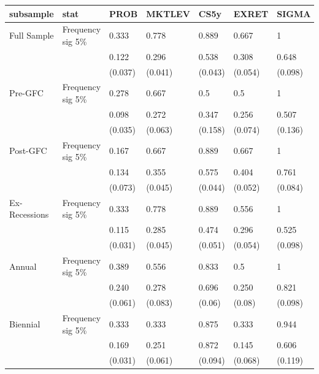 
\begin{tabular}{l|l|l|l|l|l|l}
\hline
subsample & stat & PROB & MKTLEV & CS5y & EXRET & SIGMA\\
\hline
Full Sample & Frequency sig 5\% & 0.333 & 0.778 & 0.889 & 0.667 & 1\\
 &  & 0.122 & 0.296 & 0.538 & 0.308 & 0.648\\
 &  & (0.037) & (0.041) & (0.043) & (0.054) & (0.098)\\
Pre-GFC & Frequency sig 5\% & 0.278 & 0.667 & 0.5 & 0.5 & 1\\
 &  & 0.098 & 0.272 & 0.347 & 0.256 & 0.507\\
 &  & (0.035) & (0.063) & (0.158) & (0.074) & (0.136)\\
Post-GFC & Frequency sig 5\% & 0.167 & 0.667 & 0.889 & 0.667 & 1\\
 &  & 0.134 & 0.355 & 0.575 & 0.404 & 0.761\\
 &  & (0.073) & (0.045) & (0.044) & (0.052) & (0.084)\\
Ex-Recessions & Frequency sig 5\% & 0.333 & 0.778 & 0.889 & 0.556 & 1\\
 &  & 0.115 & 0.285 & 0.474 & 0.296 & 0.525\\
 &  & (0.031) & (0.045) & (0.051) & (0.054) & (0.098)\\
Annual & Frequency sig 5\% & 0.389 & 0.556 & 0.833 & 0.5 & 1\\
 &  & 0.240 & 0.278 & 0.696 & 0.250 & 0.821\\
 &  & (0.061) & (0.083) & (0.06) & (0.08) & (0.098)\\
Biennial & Frequency sig 5\% & 0.333 & 0.333 & 0.875 & 0.333 & 0.944\\
 &  & 0.169 & 0.251 & 0.872 & 0.145 & 0.606\\
 &  & (0.031) & (0.061) & (0.094) & (0.068) & (0.119)\\
\hline
\end{tabular}
